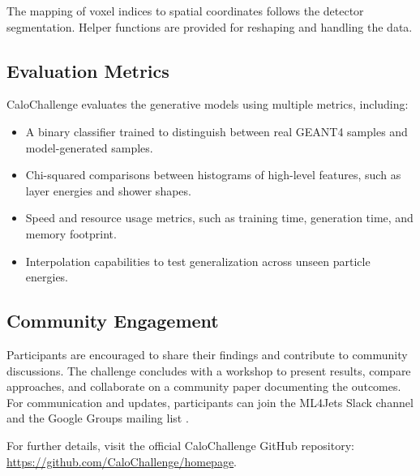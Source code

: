 The mapping of voxel indices to spatial coordinates follows the detector segmentation. Helper functions are provided for reshaping and handling the data.

\subsection{Evaluation Metrics}

CaloChallenge evaluates the generative models using multiple metrics, including:

\begin{itemize}
    \item A binary classifier trained to distinguish between real GEANT4 samples and model-generated samples.
    \item Chi-squared comparisons between histograms of high-level features, such as layer energies and shower shapes.
    \item Speed and resource usage metrics, such as training time, generation time, and memory footprint.
    \item Interpolation capabilities to test generalization across unseen particle energies.
\end{itemize}

\subsection{Community Engagement}

Participants are encouraged to share their findings and contribute to community discussions. The challenge concludes with a workshop to present results, compare approaches, and collaborate on a community paper documenting the outcomes. For communication and updates, participants can join the ML4Jets Slack channel and the Google Groups mailing list \cite{calochallenge}.

For further details, visit the official CaloChallenge GitHub repository: \url{https://github.com/CaloChallenge/homepage}.


